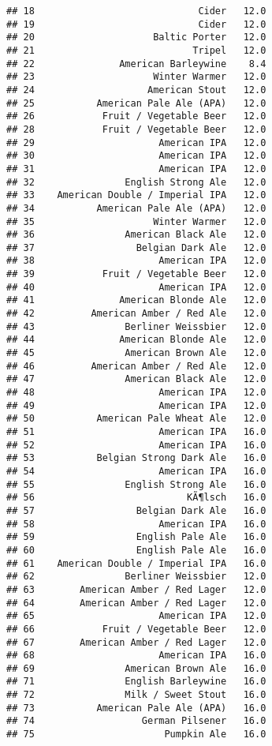 \documentclass[
]{article}
\begin{document}
\begin{verbatim}
## 18                             Cider   12.0
## 19                             Cider   12.0
## 20                     Baltic Porter   12.0
## 21                            Tripel   12.0
## 22               American Barleywine    8.4
## 23                     Winter Warmer   12.0
## 24                    American Stout   12.0
## 25           American Pale Ale (APA)   12.0
## 26            Fruit / Vegetable Beer   12.0
## 28            Fruit / Vegetable Beer   12.0
## 29                      American IPA   12.0
## 30                      American IPA   12.0
## 31                      American IPA   12.0
## 32                English Strong Ale   12.0
## 33    American Double / Imperial IPA   12.0
## 34           American Pale Ale (APA)   12.0
## 35                     Winter Warmer   12.0
## 36                American Black Ale   12.0
## 37                  Belgian Dark Ale   12.0
## 38                      American IPA   12.0
## 39            Fruit / Vegetable Beer   12.0
## 40                      American IPA   12.0
## 41               American Blonde Ale   12.0
## 42          American Amber / Red Ale   12.0
## 43                Berliner Weissbier   12.0
## 44               American Blonde Ale   12.0
## 45                American Brown Ale   12.0
## 46          American Amber / Red Ale   12.0
## 47                American Black Ale   12.0
## 48                      American IPA   12.0
## 49                      American IPA   12.0
## 50           American Pale Wheat Ale   12.0
## 51                      American IPA   16.0
## 52                      American IPA   16.0
## 53           Belgian Strong Dark Ale   16.0
## 54                      American IPA   16.0
## 55                English Strong Ale   16.0
## 56                           KÃ¶lsch   16.0
## 57                  Belgian Dark Ale   16.0
## 58                      American IPA   16.0
## 59                  English Pale Ale   16.0
## 60                  English Pale Ale   16.0
## 61    American Double / Imperial IPA   16.0
## 62                Berliner Weissbier   12.0
## 63        American Amber / Red Lager   12.0
## 64        American Amber / Red Lager   12.0
## 65                      American IPA   12.0
## 66            Fruit / Vegetable Beer   12.0
## 67        American Amber / Red Lager   12.0
## 68                      American IPA   16.0
## 69                American Brown Ale   16.0
## 71                English Barleywine   16.0
## 72                Milk / Sweet Stout   16.0
## 73           American Pale Ale (APA)   16.0
## 74                   German Pilsener   16.0
## 75                       Pumpkin Ale   16.0

\end{verbatim}
\end{document}
